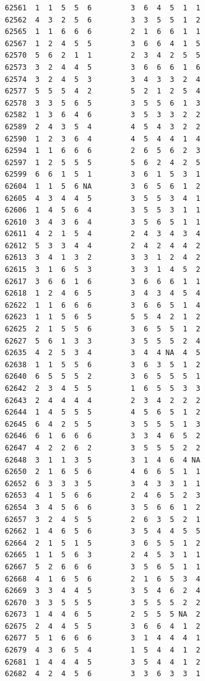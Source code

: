 \documentclass[
  letterpaper,
  DIV=11,
  numbers=noendperiod]{scrreprt}
\begin{document}
\begin{verbatim}
62561  1  1  5  5  6         3  6  4  5  1  1
62562  4  3  2  5  6         3  3  5  5  1  2
62565  1  1  6  6  6         2  1  6  6  1  1
62567  1  2  4  5  5         3  6  6  4  1  5
62570  5  6  2  1  1         2  3  4  2  5  5
62573  3  2  4  4  5         3  6  6  6  1  6
62574  3  2  4  5  3         3  4  3  3  2  4
62577  5  5  5  4  2         5  2  1  2  5  4
62578  3  3  5  6  5         3  5  5  6  1  3
62582  1  3  6  4  6         3  5  3  3  2  2
62589  2  4  3  5  4         4  5  4  3  2  2
62590  1  2  3  6  4         4  5  4  4  1  4
62594  1  1  6  6  6         2  6  5  6  2  3
62597  1  2  5  5  5         5  6  2  4  2  5
62599  6  6  1  5  1         3  6  1  5  3  1
62604  1  1  5  6 NA         3  6  5  6  1  2
62605  4  3  4  4  5         3  5  5  3  4  1
62606  1  4  5  6  4         3  5  5  3  1  1
62610  3  4  3  6  4         3  5  6  5  1  1
62611  4  2  1  5  4         2  4  3  4  3  4
62612  5  3  3  4  4         2  4  2  4  4  2
62613  3  4  1  3  2         3  3  1  2  4  2
62615  3  1  6  5  3         3  3  1  4  5  2
62617  3  6  6  1  6         3  6  6  6  1  1
62618  1  2  4  6  5         3  4  3  4  5  4
62622  1  1  6  6  6         3  6  6  5  1  4
62623  1  1  5  6  5         5  5  4  2  1  2
62625  2  1  5  5  6         3  6  5  5  1  2
62627  5  6  1  3  3         3  5  5  5  2  4
62635  4  2  5  3  4         3  4  4 NA  4  5
62638  1  1  5  5  6         3  6  3  5  1  2
62640  6  5  5  5  2         3  6  5  5  5  1
62642  2  3  4  5  5         1  6  5  5  3  3
62643  2  4  4  4  4         2  3  4  2  2  2
62644  1  4  5  5  5         4  5  6  5  1  2
62645  6  4  2  5  5         3  5  5  5  1  3
62646  6  1  6  6  6         3  3  4  6  5  2
62647  4  2  2  6  2         3  5  5  5  2  2
62648  3  1  1  3  5         3  1  4  6  4 NA
62650  2  1  6  5  6         4  6  6  5  1  1
62652  6  3  3  3  5         3  4  3  3  1  1
62653  4  1  5  6  6         2  4  6  5  2  3
62654  3  4  5  6  6         3  5  6  6  1  2
62657  3  2  4  5  5         2  6  3  5  2  1
62662  1  4  6  5  6         3  5  4  4  5  5
62664  2  1  5  1  5         3  6  5  5  1  2
62665  1  1  5  6  3         2  4  5  3  1  1
62667  5  2  6  6  6         3  5  6  5  1  1
62668  4  1  6  5  6         2  1  6  5  3  4
62669  3  3  4  4  5         3  5  4  6  2  4
62670  3  3  5  5  5         3  5  5  5  2  2
62673  1  4  4  6  5         2  5  5  5 NA  2
62675  2  4  4  5  5         3  6  6  4  1  2
62677  5  1  6  6  6         3  1  4  4  4  1
62679  4  3  6  5  4         1  5  4  4  1  2
62681  1  4  4  4  5         3  5  4  4  1  2
62682  4  2  4  5  6         3  3  6  3  3  1

\end{verbatim}
\end{document}
